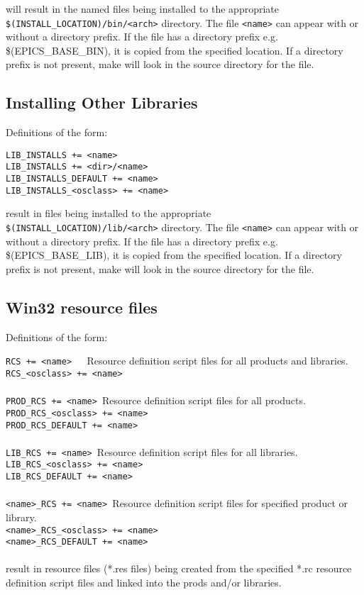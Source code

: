 will result in the named files being installed to the appropriate \verb|$(INSTALL_LOCATION)/bin/<arch>| directory. The file 
\verb|<name>| can appear with or without a directory prefix. If the file has a directory prefix e.g. \$(EPICS\_BASE\_BIN), it is 
copied from the specified location. If a directory prefix is not present, make will look in the source directory for the file.

\subsection{Installing Other Libraries}

Definitions of the form:

\begin{verbatim}
LIB_INSTALLS += <name>
LIB_INSTALLS += <dir>/<name>
LIB_INSTALLS_DEFAULT += <name>
LIB_INSTALLS_<osclass> += <name>
\end{verbatim}

result in files being installed to the appropriate \verb|$(INSTALL_LOCATION)/lib/<arch>| directory. The file \verb|<name>| can 
appear with or without a directory prefix. If the file has a directory prefix e.g. \$(EPICS\_BASE\_LIB), it is copied from the 
specified location. If a directory prefix is not present, make will look in the source directory for the file.

\subsection{Win32 resource files}

Definitions of the form:

\noindent\verb|RCS += <name>   |Resource definition script files for all products and libraries.\\
\verb|RCS_<osclass> += <name>|\\
\verb||\\
\verb|PROD_RCS += <name> |Resource definition script files for all products.\\
\verb|PROD_RCS_<osclass> += <name>|\\
\verb|PROD_RCS_DEFAULT += <name>|\\
\verb||\\
\verb|LIB_RCS += <name> |Resource definition script files for all libraries.\\
\verb|LIB_RCS_<osclass> += <name>|\\
\verb|LIB_RCS_DEFAULT += <name>|\\
\verb||\\
\verb|<name>_RCS += <name> |Resource definition script files for specified product or library.\\
\verb|<name>_RCS_<osclass> += <name>|\\
\verb|<name>_RCS_DEFAULT += <name>|\\
\verb||\\
result in resource files (*.res files) being created from the specified *.rc resource definition script files and linked into the 
prods and/or libraries.

